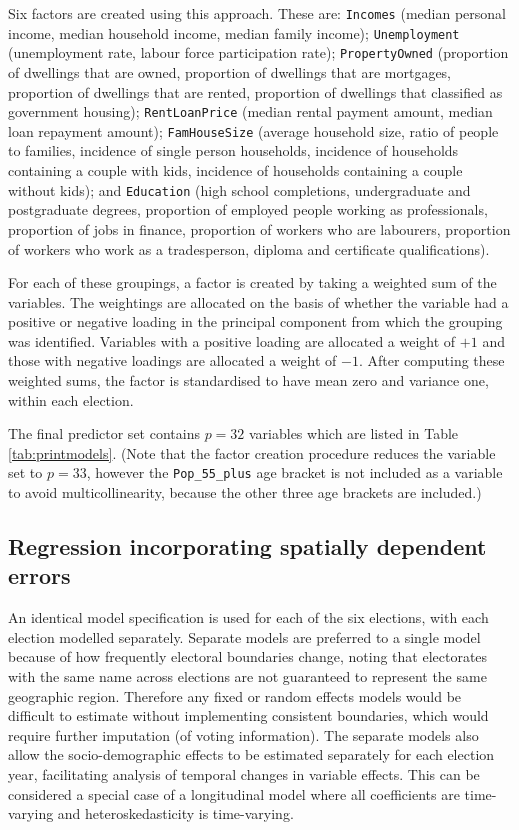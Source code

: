\documentclass[
  times, doublespace]{anzsauth}
\begin{document}
Six factors are created using this approach. These are:
\texttt{Incomes} (median personal income, median household income, median family income);
\texttt{Unemployment} (unemployment rate, labour force participation rate);
\texttt{PropertyOwned} (proportion of dwellings that are owned, proportion of dwellings that are mortgages, proportion of dwellings that are rented, proportion of dwellings that classified as government housing);
\texttt{RentLoanPrice} (median rental payment amount, median loan repayment amount);
\texttt{FamHouseSize} (average household size, ratio of people to families, incidence of single person households, incidence of households containing a couple with kids, incidence of households containing a couple without kids); and
\texttt{Education} (high school completions, undergraduate and postgraduate degrees, proportion of employed people working as professionals, proportion of jobs in finance, proportion of workers who are labourers, proportion of workers who work as a tradesperson, diploma and certificate qualifications).

For each of these groupings, a factor is created by taking a weighted sum of the variables. The weightings are allocated on the basis of whether the variable had a positive or negative loading in the principal component from which the grouping was identified. Variables with a positive loading are allocated a weight of \(+1\) and those with negative loadings are allocated a weight of \(-1\). After computing these weighted sums, the factor is standardised to have mean zero and variance one, within each election.

The final predictor set contains \(p=32\) variables which are listed in Table \ref{tab:printmodels}. (Note that the factor creation procedure reduces the variable set to \(p=33\), however the \texttt{Pop\_55\_plus} age bracket is not included as a variable to avoid multicollinearity, because the other three age brackets are included.)

\hypertarget{regression-incorporating-spatially-dependent-errors}{%
\subsection{Regression incorporating spatially dependent errors}\label{regression-incorporating-spatially-dependent-errors}}

An identical model specification is used for each of the six elections, with each election modelled separately. Separate models are preferred to a single model because of how frequently electoral boundaries change, noting that electorates with the same name across elections are not guaranteed to represent the same geographic region. Therefore any fixed or random effects models would be difficult to estimate without implementing consistent boundaries, which would require further imputation (of voting information). The separate models also allow the socio-demographic effects to be estimated separately for each election year, facilitating analysis of temporal changes in variable effects. This can be considered a special case of a longitudinal model where all coefficients are time-varying and heteroskedasticity is time-varying.
\end{document}
